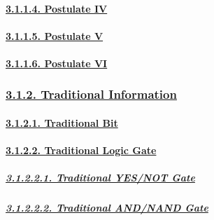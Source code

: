 \documentclass[
]{article}
\begin{document}
\hypertarget{postulate-iv}{%
\paragraph{\texorpdfstring{\protect\hyperlink{postulate-iv-1}{3.1.1.4.
Postulate IV}}{3.1.1.4. Postulate IV}}\label{postulate-iv}}

\hypertarget{postulate-v}{%
\paragraph{\texorpdfstring{\protect\hyperlink{postulate-v-1}{3.1.1.5.
Postulate V}}{3.1.1.5. Postulate V}}\label{postulate-v}}

\hypertarget{postulate-vi}{%
\paragraph{\texorpdfstring{\protect\hyperlink{postulate-vi-1}{3.1.1.6.
Postulate VI}}{3.1.1.6. Postulate VI}}\label{postulate-vi}}

\hypertarget{traditional-information}{%
\subsubsection{\texorpdfstring{\protect\hyperlink{traditional-information-1}{3.1.2.
Traditional
Information}}{3.1.2. Traditional Information}}\label{traditional-information}}

\hypertarget{traditional-bit}{%
\paragraph{\texorpdfstring{\protect\hyperlink{traditional-bit-1}{3.1.2.1.
Traditional Bit}}{3.1.2.1. Traditional Bit}}\label{traditional-bit}}

\hypertarget{traditional-logic-gate}{%
\paragraph{\texorpdfstring{\protect\hyperlink{traditional-logic-gate-1}{3.1.2.2.
Traditional Logic
Gate}}{3.1.2.2. Traditional Logic Gate}}\label{traditional-logic-gate}}

\hypertarget{traditional-yesnot-gate}{%
\subparagraph{\texorpdfstring{\protect\hyperlink{traditional-yesnot-gate-1}{3.1.2.2.1.
Traditional YES/NOT
Gate}}{3.1.2.2.1. Traditional YES/NOT Gate}}\label{traditional-yesnot-gate}}

\hypertarget{traditional-andnand-gate}{%
\subparagraph{\texorpdfstring{\protect\hyperlink{traditional-andnand-gate-1}{3.1.2.2.2.
Traditional AND/NAND
Gate}}{3.1.2.2.2. Traditional AND/NAND Gate}}\label{traditional-andnand-gate}}
\end{document}
